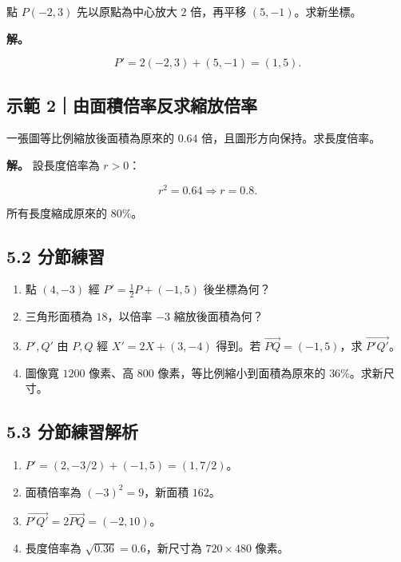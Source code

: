 \documentclass[11pt,a4paper]{article}
\providecommand{\tightlist}{%
  \setlength{\itemsep}{0pt}\setlength{\parskip}{0pt}}
\begin{document}
點 \(P(-2,3)\) 先以原點為中心放大 \(2\) 倍，再平移 \((5,-1)\)。求新坐標。

\textbf{解。}

\[
P'=2(-2,3)+(5,-1)=(1,5).
\]

\subsection{示範 2｜由面積倍率反求縮放倍率}\label{ux793aux7bc4-2ux7531ux9762ux7a4dux500dux7387ux53cdux6c42ux7e2eux653eux500dux7387}

一張圖等比例縮放後面積為原來的 \(0.64\) 倍，且圖形方向保持。求長度倍率。

\textbf{解。} 設長度倍率為 \(r>0\)：

\[
r^2=0.64\Rightarrow r=0.8.
\]

所有長度縮成原來的 \(80\%\)。

\subsection{5.2 分節練習}\label{ux5206ux7bc0ux7df4ux7fd2-4}

\begin{enumerate}
\def\labelenumi{\arabic{enumi}.}
\tightlist
\item
  點 \((4,-3)\) 經 \(P'=\frac12P+(-1,5)\) 後坐標為何？
\item
  三角形面積為 \(18\)，以倍率 \(-3\) 縮放後面積為何？
\item
  \(P',Q'\) 由 \(P,Q\) 經 \(X'=2X+(3,-4)\) 得到。若 \(\overrightarrow{PQ}=(-1,5)\)，求 \(\overrightarrow{P'Q'}\)。
\item
  圖像寬 \(1200\) 像素、高 \(800\) 像素，等比例縮小到面積為原來的 \(36\%\)。求新尺寸。
\end{enumerate}

\subsection{5.3 分節練習解析}\label{ux5206ux7bc0ux7df4ux7fd2ux89e3ux6790-4}

\begin{enumerate}
\def\labelenumi{\arabic{enumi}.}
\tightlist
\item
  \(P'=(2,-3/2)+(-1,5)=(1,7/2)\)。
\item
  面積倍率為 \((-3)^2=9\)，新面積 \(162\)。
\item
  \(\overrightarrow{P'Q'}=2\overrightarrow{PQ}=(-2,10)\)。
\item
  長度倍率為 \(\sqrt{0.36}=0.6\)，新尺寸為 \(720\times480\) 像素。
\end{enumerate}
\end{document}
